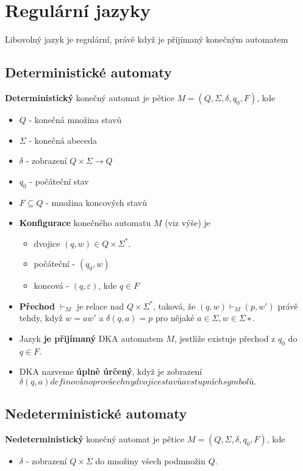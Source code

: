 \documentclass{szzclass}
\begin{document}
\section{Regulární jazyky}
\begin{theorem}
Libovolný jazyk je regulární, právě když je přijímaný konečným automatem
\end{theorem}

\subsection{Deterministické automaty}
\begin{definition}
\textbf{Deterministický} konečný automat je pětice $M=(Q,\Sigma,\delta,q_0,F)$, kde
\begin{itemize}
\item $Q$ - konečná množina stavů
\item $\Sigma$ - konečná abeceda
\item $\delta$ - zobrazení $Q\times\Sigma \to Q$
\item $q_0$ - počáteční stav
\item $F\subseteq Q$ - množina koncových stavů
\end{itemize}
\end{definition}

\begin{itemize}
\item \textbf{Konfigurace} konečného automatu $M$ (viz výše) je
  \begin{itemize}
  \item dvojice $(q,w)\in Q\times \Sigma^{*}$.
  \item počáteční - $(q_0,w)$
  \item koncová - $(q,\varepsilon)$, kde $q\in F$
  \end{itemize}
\item \textbf{Přechod} $\vdash_M$ je relace nad $Q\times\Sigma^{*}$, taková, že $(q, w) \vdash_M (p, w')$ právě tehdy, když $w = aw'$ a $\delta(q, a) = p$ pro nějaké $a\in\Sigma,w \in \Sigma{∗}.$
\item Jazyk \textbf{je přijímaný} DKA automatem $M$, jestliže existuje přechod z $q_0$ do $q\in F$.
\item DKA nazveme \textbf{úplně úrčený}, když je zobrazení $\delta(q,a) definováno pro všechny dvojice stavů a vstupních symbolů.$
\end{itemize}

\subsection{Nedeterministické automaty}
\begin{definition}
\textbf{Nedeterministický} konečný automat je pětice $M=(Q,\Sigma,\delta,q_0,F)$, kde
\begin{itemize}
\item $\delta$ - zobrazení $Q\times\Sigma$ do množiny všech podmnožin $Q$.
\end{itemize}
\end{definition}
\end{document}
